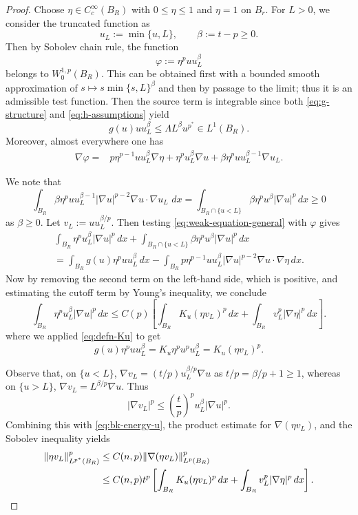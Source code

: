 \documentclass[reqno,12pt]{amsart}
\numberwithin{equation}{section}
\theoremstyle{remark}
\newcommand{\dd}{\,d}
\begin{document}
\begin{proof}
Choose $\eta\in C_c^\infty(B_R)$ with $0\le\eta\le1$ and $\eta=1$ on $B_r$.  For $L>0$, we consider the truncated function as
$$
u_L:=\min\{u,L\}, \qquad \beta:=t-p\ge 0. 
$$
Then by Sobolev chain rule, the function
$$
\varphi:=\eta^p u u_L^\beta
$$
belongs to $W^{1,p}_0(B_R)$.  This can be obtained first with a bounded smooth approximation of $s\mapsto s\min\{s,L\}^\beta$ and then by passage to the limit; thus it is an admissible test function.  Then the source term is integrable since both \eqref{eq:g-structure} and \eqref{eq:h-assumptions} yield
$$
g(u)u u_L^\beta \le \Lambda L^\beta u^{p^*}\in L^1(B_R).
$$
Moreover, almost everywhere one has
\begin{align*}
 \nabla\varphi={}&p\eta^{p-1}u u_L^\beta\nabla\eta
 +\eta^p u_L^\beta\nabla u  +\beta\eta^p u u_L^{\beta-1}\nabla u_L.
\end{align*}
  
We note that
$$\int_{B_R}\beta\eta^p u u_L^{\beta-1}|\nabla u|^{p-2}\nabla u\cdot\nabla u_{L}\, \dd x=\int_{B_R\cap \{u< L\}}\beta\eta^p u^{\beta}|\nabla u|^{p} \,dx\ge 0$$
as $\beta\ge 0.$
Let $v_L:=u u_L^{\beta/p}$.
Then testing \eqref{eq:weak-equation-general} with $\varphi$ gives
\begin{multline*}
     \int_{B_R}\eta^p u_L^\beta|\nabla u|^p\,dx + \int_{B_R\cap \{u< L\}}\beta\eta^p u^{\beta}|\nabla u|^{p} \,dx \\=   \int_{B_R}g(u)\eta^p u u_L^\beta \,dx -\int_{B_R} p \eta^{p-1} u u_L^{\beta}|\nabla u|^{p-2} \nabla u\cdot\nabla \eta\,dx.
\end{multline*}
Now by removing the second term on the left-hand side, which is positive, and estimating the cutoff term by Young's inequality, we conclude 
\begin{equation}\label{eq:bk-energy-u}
 \int_{B_R}\eta^p u_L^\beta|\nabla u|^p\,dx
 \le C(p)\left[\int_{B_R}K_u(\eta v_L)^p\,dx + \int_{B_R}v_L^p|\nabla\eta|^p \,dx \right].
\end{equation}
where we applied \eqref{eq:defn-Ku} to get
$$
g(u)\eta^p u u_L^\beta =K_u\eta^p u^p u_L^\beta =K_u(\eta v_L)^p.
$$

Observe that, on $\{u<L\}$,
$\nabla v_L=(t/p)u_L^{\beta/p}\nabla u$ as $t/p=\beta/p+1\ge 1$, whereas on $\{u>L\}$,
$\nabla v_L=L^{\beta/p}\nabla u$.  Thus
$$
|\nabla v_L|^p \le\left(\frac tp\right)^p u_L^\beta|\nabla u|^p.
$$
Combining this with \eqref{eq:bk-energy-u}, the product estimate for
$\nabla(\eta v_L)$, and the Sobolev inequality yields
\begin{align}\label{eq:bk-sobolev}
\|\eta v_L\|_{L^{p^*}(B_R)}^p &\le C(n,p)  \|\nabla(\eta v_L)\|_{L^{p}(B_R)}^p\notag\\
&\le   C(n,p)t^p\left[\int_{B_R}K_u(\eta v_L)^p \,dx + \int_{B_R}v_L^p|\nabla\eta|^p\,dx  \right].
\end{align}




\end{proof}
\end{document}
